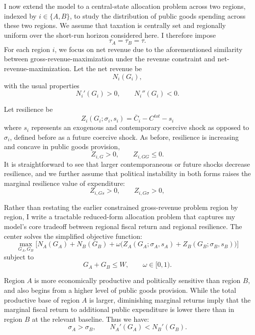 \documentclass[12pt]{article}
\begin{document}
I now extend the model to a central-state allocation problem across two regions, indexed by $i\in\{A,B\}$, to study the distribution of public goods spending across these two regions. We assume that taxation is centrally set and regionally uniform over the short-run horizon considered here. I therefore impose
\[
\tau_A=\tau_B=\tau.
\]
For each region $i$, we focus on net revenue due to the aforementioned similarity between gross-revenue-maximization under the revenue constraint and net-revenue-maximization. Let the net revenue be
\begin{equation}
N_i(G_i),
\end{equation}
with the usual properties
\begin{equation}
N_i'(G_i)>0,
\qquad
N_i''(G_i)<0.
\end{equation}

Let resilience be
\begin{equation}
Z_i(G_i;\sigma_i, s_i) = \bar C_i - C^{tot} - s_i
\end{equation}
where $s_i$ represents an exogenous and contemporary coercive shock as opposed to $\sigma_i$, defined before as a future coercive shock. As before, resilience is increasing and concave in public goods provision,
\begin{equation}
Z_{i,G}>0,
\qquad
Z_{i,GG}\le 0.
\end{equation}
It is straightforward to see that larger contemporaneous or future shocks decrease resilience, and we further assume that political instability in both forms raises the marginal resilience value of expenditure:
\begin{equation}
Z_{i,Gs}>0,
\qquad
Z_{i,G\sigma}>0,
\end{equation}

Rather than restating the earlier constrained gross-revenue problem region by region, I write a tractable reduced-form allocation problem that captures my model's core tradeoff between regional fiscal return and regional resilience. The center solves the simplified objective function:
\begin{equation}
\max_{G_A,G_B}
\Big[
N_A(G_A)+N_B(G_B)
+\omega\bigl(Z_A(G_A;\sigma_A,s_A)+Z_B(G_B;\sigma_B,s_B)\bigr)
\Big]
\end{equation}
subject to
\begin{equation}
G_A+G_B\le W,
\qquad
\omega\in[0,1).
\end{equation}

Region $A$ is more economically productive and politically sensitive than region $B$, and also begins from a higher level of public goods provision.  While the total productive base of region $A$ is larger, diminishing marginal returns imply that the marginal fiscal return to additional public expenditure is lower there than in region $B$ at the relevant baseline. Thus we have:
\begin{equation}
\sigma_A>\sigma_B,
\qquad
N_A'(G_A)<N_B'(G_B).
\end{equation}
\end{document}
